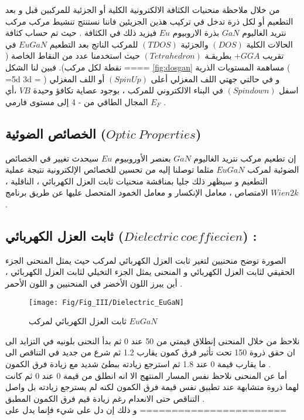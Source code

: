 من خلال ملاحظة منحنيات الكثافة الالكترونية الكلية أو الجزئية للمركبين قبل و بعد التطعيم أو لكل ذرة تدخل في تركيب هذين الجزيئين  فاننا نستنتج تنشيط مركب مركب نتريد الغاليوم $ GaN $ بذرة الاروبيوم $ Eu $ فيزيد ذلك في الكثافة .
حيث تم حساب كثافة الحالات الكلية $ ( DOS) $ والجزئية $ (TDOS) $ للمركب الناتج بعد التطعيم $ EuGaN $  في تقريب $ +GGA  $ بطريقـة $ ( Tetrahedron ) $ حيث استخدمنا عدد من النقاط الخاصة ( ==== نقطة لكل مركب). فبين لنا الشكل \ref{fig:dosgan} مساهمة المستويات الذرية ( =5d 3d = ) و في حالتي جهتي اللف المغزلي أعلى $ ( Spin Up ) $ أو اللف المغزلي اسفل $ ( Spin down ) $ في البناء الالكتروني للمركب ، بوجود عصاية تكافؤ وحيدة $ VB $ ،أي المجال الطاقي من - 4 إلى مستوى فارمي $ E_{F} $ . 

\subsection{ الخصائص الضوئية ($ Optic~Properties $) }
إن تطعيم مركب نتريد الغاليوم $ GaN $ بعنصر الأوروبيوم $ Eu $ سيحدث تغيير في الخصائص الضوئية لمركب $ EuGaN $ مثلما توصلنا إليه من تحسين للخصائص الإلكترونية نتيجة عملية التطعيم و سيظهر ذلك جليا بمناقشة منحنيات ثابت العزل الكهربائي ، الناقلية ، الامتصاص ، معامل الإنكسار و معامل الخمود المتحصل عليها عن طريق برنامج $ Wien2k $ .
\subsection*{  ثابت العزل الكهربائي  ($ Dielectric~coeffiecien $) :  }
الصورة توضح منحنيين لتغير ثابت العزل الكهربائي لمركب  حيث يمثل المنحنى  الجزء الحقيقي لثابت العزل الكهربائي و المنحنى  يمثل الجزء التخيلي لثابت العزل الكهربائي ، أين يبرز اللون الأخضر في المنحنيين  و اللون الأحمر  .
\begin{figure}[h!]
	\centering
	\texttt{[image: Fig/Fig\_III/Dielectric\_EuGaN]}
	\caption{ثابت العزل الكهربائي لمركب $  EuGaN $}
	\label{fig:dielectriceugan}
\end{figure}
\FloatBarrier
نلاحظ من خلال المنحنى  إنطلاق قيمتي  من 50 عند 0  ثم بدأ النحنى بلونيه في التزايد الى ان حقق ذروة 150 تحت تأثير فرق كمون يقارب 1.2  ثم شرع من جديد في التناقص الى ما يقارب قيمة 0  عند 1.8  ثم استرجع زيادته ببطئ شديد مع زيادة فرق الكمون .\\
أما عن المنحنى  نلاحظ نفس المسار المنتهج الا انه انطلق من قيمة 0  عند 0  ثم كانت لهما ذروة متشابهة عند تطبيق نفس قيمة فرق الكمون لكنه لم يسترجع زيادته بل واصل التناقص حتى الانعدام رغم زيادة قيم فرق الكمون المطبق .\\
و ذلك إن دل على شيء فإنما يدل على =======================

